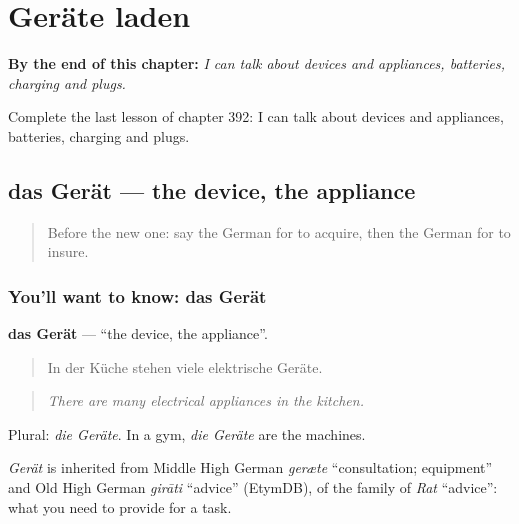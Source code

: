 
\chapter{Geräte laden}
\label{ch:ge-gerate-laden}

\begin{chapteropening}
\textbf{By the end of this chapter:} \emph{I can talk about devices and appliances, batteries, charging and plugs.}

Complete the last lesson of chapter 392: I can talk about devices and appliances, batteries, charging and plugs.
\end{chapteropening}

\section[das Gerät]{das Gerät — the device, the appliance}

\label{lesson:GE-C392-geraet}



\begin{quote}
Before the new one: say the German for to acquire, then the German for to insure.
\end{quote}

\subsection*{You'll want to know: das Gerät}
\textbf{das Gerät} — \textquotedblleft{}the device, the appliance\textquotedblright{}.

\begin{quote}
In der Küche stehen viele elektrische Geräte.
\end{quote}

\begin{quote}
\emph{There are many electrical appliances in the kitchen.}
\end{quote}

Plural: \emph{die Geräte}. In a gym, \emph{die Geräte} are the machines.

\begin{cousinweb}
\emph{Gerät} is inherited from Middle High German \emph{geræte} \textquotedblleft{}consultation; equipment\textquotedblright{} and Old High German \emph{girāti} \textquotedblleft{}advice\textquotedblright{} (EtymDB), of the family of \emph{Rat} \textquotedblleft{}advice\textquotedblright{}: what you need to provide for a task.
\end{cousinweb}

